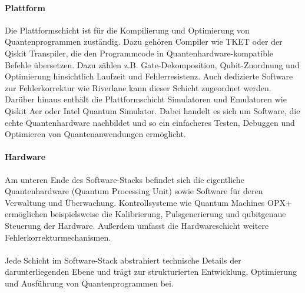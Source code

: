 \paragraph{Plattform}  
Die Plattformschicht ist für die Kompilierung und Optimierung von Quantenprogrammen zuständig. Dazu gehören Compiler wie TKET oder der Qiskit Transpiler, die den Programmcode in Quantenhardware-kompatible Befehle übersetzen. Dazu zählen z.B. Gate-Dekomposition, Qubit-Zuordnung und Optimierung hinsichtlich Laufzeit und Fehlerresistenz. Auch dedizierte Software zur Fehlerkorrektur wie Riverlane kann dieser Schicht zugeordnet werden. Darüber hinaus enthält die Plattformschicht Simulatoren und Emulatoren wie Qiskit Aer oder Intel Quantum Simulator. Dabei handelt es sich um Software, die echte Quantenhardware nachbildet und so ein einfacheres Testen, Debuggen und Optimieren von Quantenanwendungen ermöglicht.
\\
\paragraph{Hardware}  
Am unteren Ende des Software-Stacks befindet sich die eigentliche Quantenhardware (Quantum Processing Unit) sowie Software für deren Verwaltung und Überwachung. Kontrollsysteme wie Quantum Machines OPX+ ermöglichen beispielsweise die Kalibrierung, Pulsgenerierung und qubitgenaue Steuerung der Hardware. Außerdem umfasst die Hardwareschicht weitere Fehlerkorrekturmechanismen.
\\
\\
Jede Schicht im Software-Stack abstrahiert technische Details der darunterliegenden Ebene und trägt zur strukturierten Entwicklung, Optimierung und Ausführung von Quantenprogrammen bei. \autocite{shehata_building_2025} \autocite{ryan_understanding_2024}

